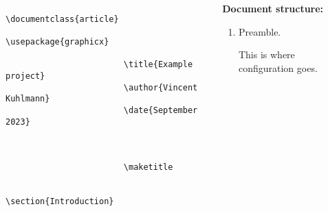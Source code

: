 \copyrightVincent

\begin{frame}[fragile]
    \begin{columns}
        \begin{column}{0.4\textwidth}
            \begin{adjustbox}{frame=1pt 5pt,valign=t}%
                \begin{minipage}{\textwidth}%
                    \begin{verbatim} 
                        \documentclass{article}
                        \usepackage{graphicx}

                        \title{Example project}
                        \author{Vincent Kuhlmann}
                        \date{September 2023}

                        

                        \maketitle

                        \section{Introduction}

                        
                    \end{verbatim}
                \end{minipage}
            \end{adjustbox}
        \end{column}
        \begin{column}{0.6\textwidth}
            {\large\textbf{Document structure:}}

            \begin{enumerate}[label=\textbullet]
                \item {}\; Preamble. 

                This is where configuration goes.


\end{enumerate}
\end{column}
\end{columns}
\end{frame}
